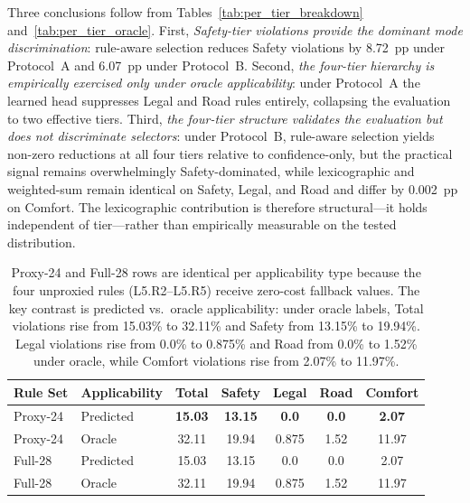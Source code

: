Three conclusions follow from Tables~\ref{tab:per_tier_breakdown} and~\ref{tab:per_tier_oracle}.  First, \emph{Safety-tier violations provide the dominant mode discrimination}: rule-aware selection reduces Safety violations by 8.72~pp under Protocol~A and 6.07~pp under Protocol~B.  Second, \emph{the four-tier hierarchy is empirically exercised only under oracle applicability}: under Protocol~A the learned head suppresses Legal and Road rules entirely, collapsing the evaluation to two effective tiers.  Third, \emph{the four-tier structure validates the evaluation but does not discriminate selectors}: under Protocol~B, rule-aware selection yields non-zero reductions at all four tiers relative to confidence-only, but the practical signal remains overwhelmingly Safety-dominated, while lexicographic and weighted-sum remain identical on Safety, Legal, and Road and differ by 0.002~pp on Comfort.  The lexicographic contribution is therefore structural---it holds independent of tier---rather than empirically measurable on the tested distribution.

\begin{table}[t]
\centering
\caption{Protocol Matrix: Violation Rates (\%) under Four Evaluation Configurations (12{,}800 Scenarios, Lexicographic Selection)}
\label{tab:protocol_matrix}
\setlength{\tabcolsep}{3pt}
\begin{tabular}{llccccc}
\toprule
\textbf{Rule Set} & \textbf{Applicability} & \textbf{Total} & \textbf{Safety} & \textbf{Legal} & \textbf{Road} & \textbf{Comfort} \\
\midrule
Proxy-24 & Predicted & \textbf{15.03} & \textbf{13.15} & \textbf{0.0} & \textbf{0.0} & \textbf{2.07} \\
Proxy-24 & Oracle    & 32.11 & 19.94 & 0.875 & 1.52 & 11.97 \\
\midrule
Full-28  & Predicted & 15.03 & 13.15 & 0.0 & 0.0 & 2.07 \\
Full-28  & Oracle    & 32.11 & 19.94 & 0.875 & 1.52 & 11.97 \\
\bottomrule
\end{tabular}
\vspace{1mm}
\caption*{\footnotesize Proxy-24 and Full-28 rows are identical per applicability type because the four unproxied rules (L5.R2--L5.R5) receive zero-cost fallback values.  The key contrast is predicted vs.\ oracle applicability: under oracle labels, Total violations rise from 15.03\% to 32.11\% and Safety from 13.15\% to 19.94\%.  Legal violations rise from 0.0\% to 0.875\% and Road from 0.0\% to 1.52\% under oracle, while Comfort violations rise from 2.07\% to 11.97\%.}
\end{table}

